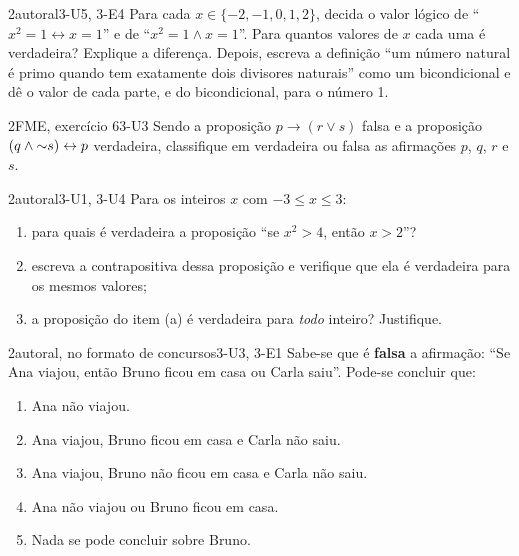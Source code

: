 \begin{questao}{2}{autoral}{3-U5, 3-E4}\label{u3:q5}
Para cada $x\in\{-2,-1,0,1,2\}$, decida o valor lógico de \enquote{$x^2=1\leftrightarrow x=1$} e de \enquote{$x^2=1\wedge x=1$}. Para quantos valores de $x$ cada uma é verdadeira? Explique a diferença. Depois, escreva a definição \enquote{um número natural é primo quando tem exatamente dois divisores naturais} como um bicondicional e dê o valor de cada parte, e do bicondicional, para o número 1.
\end{questao}

\begin{questao}{2}{FME, exercício 6}{3-U3}\label{u3:q6}
Sendo a proposição $p\rightarrow(r\vee s)$ falsa e a proposição $(q\wedge{{\sim}}s)\leftrightarrow p$ verdadeira, classifique em verdadeira ou falsa as afirmações $p$, $q$, $r$ e $s$.
\end{questao}

\begin{questao}[integradora]{2}{autoral}{3-U1, 3-U4}\label{u3:q7}
Para os inteiros $x$ com $-3\le x\le3$:
\begin{enumerate}[label=\alph*)]
  \item para quais é verdadeira a proposição \enquote{se $x^2>4$, então $x>2$}?
  \item escreva a contrapositiva dessa proposição e verifique que ela é verdadeira para os mesmos valores;
  \item a proposição do item (a) é verdadeira para \emph{todo} inteiro? Justifique.
\end{enumerate}
\end{questao}

\begin{questao}{2}{autoral, no formato de concursos}{3-U3, 3-E1}\label{u3:q8}
Sabe-se que é \textbf{falsa} a afirmação: \enquote{Se Ana viajou, então Bruno ficou em casa ou Carla saiu}. Pode-se concluir que:
\begin{enumerate}[label=(\alph*)]
  \item Ana não viajou.
  \item Ana viajou, Bruno ficou em casa e Carla não saiu.
  \item Ana viajou, Bruno não ficou em casa e Carla não saiu.
  \item Ana não viajou ou Bruno ficou em casa.
  \item Nada se pode concluir sobre Bruno.
\end{enumerate}
\end{questao}

